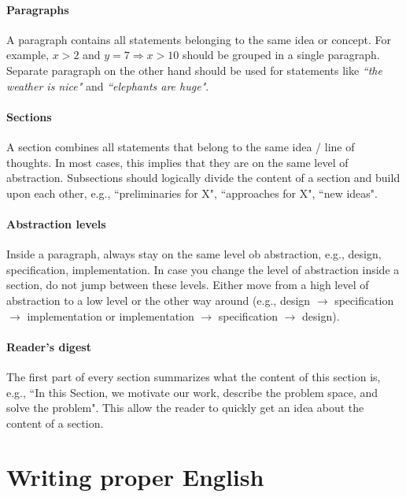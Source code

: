 \documentclass{article}
\begin{document}
\paragraph{Paragraphs}
A paragraph contains all statements belonging to the same idea or concept.
For example, $x > 2$ and $y = 7 \Rightarrow x > 10$ should be grouped in a single paragraph.
Separate paragraph on the other hand should be used for statements like \emph{``the weather is nice"} and \emph{``elephants are huge"}.

\paragraph{Sections}
A section combines all statements that belong to the same idea / line of thoughts.
In most cases, this implies that they are on the same level of abstraction.
Subsections should logically divide the content of a section and build upon each other, e.g., ``preliminaries for X", ``approaches for X", ``new ideas".

\paragraph{Abstraction levels}
Inside a paragraph, always stay on the same level ob abstraction, e.g., design, specification, implementation.
In case you change the level of abstraction inside a section, do not jump between these levels.
Either move from a high level of abstraction to a low level or the other way around (e.g., design $\rightarrow$ specification $\rightarrow$ implementation or implementation $\rightarrow$ specification $\rightarrow$ design).

\paragraph{Reader's digest}
The first part of every section summarizes what the content of this section is, e.g., ``In this Section, we motivate our work, describe the problem space, and solve the problem".
This allow the reader to quickly get an idea about the content of a section.










\section{Writing proper English}
\end{document}
